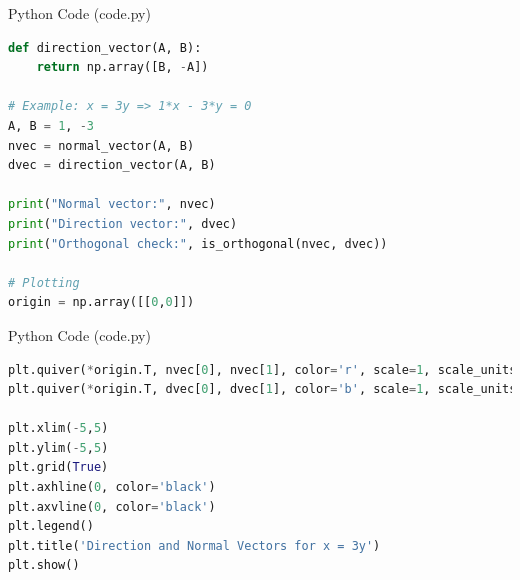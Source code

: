 \documentclass{beamer}
\begin{document}
\begin{frame}[fragile]{Python Code (code.py)}
\begin{lstlisting}[language=Python]
def direction_vector(A, B):
    return np.array([B, -A])

# Example: x = 3y => 1*x - 3*y = 0
A, B = 1, -3
nvec = normal_vector(A, B)
dvec = direction_vector(A, B)

print("Normal vector:", nvec)
print("Direction vector:", dvec)
print("Orthogonal check:", is_orthogonal(nvec, dvec))

# Plotting
origin = np.array([[0,0]])
\end{lstlisting}
\end{frame}
\begin{frame}[fragile]{Python Code (code.py)}
\begin{lstlisting}[language=Python]
plt.quiver(*origin.T, nvec[0], nvec[1], color='r', scale=1, scale_units='xy', angles='xy', label='Normal')
plt.quiver(*origin.T, dvec[0], dvec[1], color='b', scale=1, scale_units='xy', angles='xy', label='Direction')

plt.xlim(-5,5)
plt.ylim(-5,5)
plt.grid(True)
plt.axhline(0, color='black')
plt.axvline(0, color='black')
plt.legend()
plt.title('Direction and Normal Vectors for x = 3y')
plt.show()
\end{lstlisting}
\end{frame}
\end{document}
